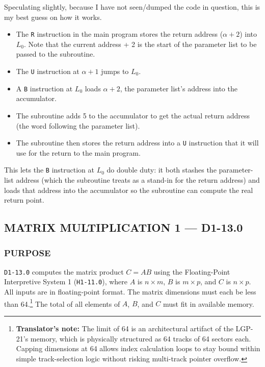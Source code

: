 Speculating slightly, because I have not seen/dumped the code in question, this is my best guess on how it works.
\begin{itemize}
	\item The \texttt{R} instruction in the main program stores the return address ($\alpha+2$) into $L_0$. Note that the current address + 2 is the start of the parameter list to be passed to the subroutine.
	\item The \texttt{U} instruction at $\alpha+1$ jumps to $L_0$.
	\item A \texttt{B} instruction at $L_0$ loads $\alpha+2$, the parameter list's address into the accumulator.
	\item The subroutine adds 5 to the accumulator to get the actual return address (the word following the parameter list).
	\item The subroutine then stores the return address into a \texttt{U} instruction that it will use for the return to the main program.
\end{itemize}
\noindent
This lets the \texttt{B} instruction at $L_0$ do double duty: it both stashes the parameter-list address (which the subroutine treats as a stand-in for the return address) and loads that address into the accumulator so the subroutine can compute the real return point.
\newpage

\subsection*{MATRIX MULTIPLICATION 1 --- D1-13.0}
\label{subsec:matrix_multiplication_1}

\subsubsection*{PURPOSE}
\texttt{D1-13.0} computes the matrix product $C = AB$ using the Floating-Point Interpretive System 1 (\texttt{H1-11.0}), where $A$ is $n \times m$, $B$ is $m \times p$, and $C$ is $n \times p$. All inputs are in floating-point format. The matrix dimensions must each be less than 64.\footnote{\textbf{Translator's note:} The limit of 64 is an architectural artifact of the LGP-21's memory, which is physically structured as 64 tracks of 64 sectors each. Capping dimensions at 64 allows index calculation loops to stay bound within simple track-selection logic without risking multi-track pointer overflow.} The total of all elements of $A$, $B$, and $C$ must fit in available memory.


